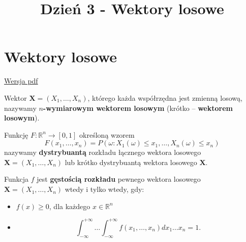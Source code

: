 \documentclass[]{article}
\title{Dzień 3 - Wektory losowe}
\author{}
\date{}
\providecommand{\tightlist}{%
  \setlength{\itemsep}{0pt}\setlength{\parskip}{0pt}}
\begin{document}
\maketitle

{
\setcounter{tocdepth}{5}
\tableofcontents
}
\section{Wektory losowe}\label{wektory-losowe}

\href{wektorylosowe.pdf}{Wersja pdf}

Wektor \(\mathbf{X} = (X_1, \ldots, X_n)\), którego każda współrzędna
jest zmienną losową, nazywamy \textbf{\(n\)-wymiarowym wektorem losowym}
(krótko -- \textbf{wektorem losowym}).

Funkcję \(F : \mathbb{R}^n \rightarrow [0, 1]\) określoną wzorem
\[F(x_1, \ldots, x_n) = P({\omega : X_1(\omega) ≤ x_1, \ldots , X_n(\omega) ≤ x_n})\]
nazywamy \textbf{dystrybuantą} rozkładu łącznego wektora losowego
\(\mathbf{X} = (X_1, \ldots, X_n)\) lub krótko dystrybuantą wektora
losowego \(\mathbf{X}\).

Funkcja \(f\) jest \textbf{gęstością rozkładu} pewnego wektora losowego
\(\mathbf{X} = (X_1, \ldots, X_n)\) wtedy i tylko wtedy, gdy:

\begin{itemize}
\tightlist
\item
  \(f(x) \geqslant 0\), dla każdego \(x\in\mathbb{R}^n\)
\item
  \[ \int_{-\infty}^{+\infty}\ldots \int_{-\infty}^{+\infty}
  f(x_1, \ldots , x_n)dx_1 \ldots x_n = 1.\]
\end{itemize}
\end{document}
